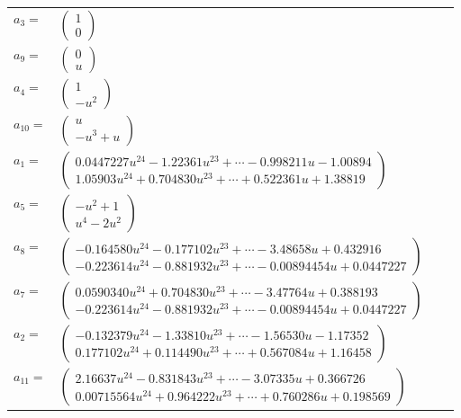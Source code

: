 \documentclass[1p]{elsarticle_modified}
\theoremstyle{definition}
\begin{document}
\begin{tabular}{m{7pt} m{180pt} m{7pt} m{180pt} }
\flushright $a_{3}=$&$\begin{pmatrix}1\\0\end{pmatrix}$ \\
\flushright $a_{9}=$&$\begin{pmatrix}0\\u\end{pmatrix}$ \\
\flushright $a_{4}=$&$\begin{pmatrix}1\\- u^2\end{pmatrix}$ \\
\flushright $a_{10}=$&$\begin{pmatrix}u\\- u^3+u\end{pmatrix}$ \\
\flushright $a_{1}=$&$\begin{pmatrix}0.0447227 u^{24}-1.22361 u^{23}+\cdots-0.998211 u-1.00894\\1.05903 u^{24}+0.704830 u^{23}+\cdots+0.522361 u+1.38819\end{pmatrix}$ \\
\flushright $a_{5}=$&$\begin{pmatrix}- u^2+1\\u^4-2 u^2\end{pmatrix}$ \\
\flushright $a_{8}=$&$\begin{pmatrix}-0.164580 u^{24}-0.177102 u^{23}+\cdots-3.48658 u+0.432916\\-0.223614 u^{24}-0.881932 u^{23}+\cdots-0.00894454 u+0.0447227\end{pmatrix}$ \\
\flushright $a_{7}=$&$\begin{pmatrix}0.0590340 u^{24}+0.704830 u^{23}+\cdots-3.47764 u+0.388193\\-0.223614 u^{24}-0.881932 u^{23}+\cdots-0.00894454 u+0.0447227\end{pmatrix}$ \\
\flushright $a_{2}=$&$\begin{pmatrix}-0.132379 u^{24}-1.33810 u^{23}+\cdots-1.56530 u-1.17352\\0.177102 u^{24}+0.114490 u^{23}+\cdots+0.567084 u+1.16458\end{pmatrix}$ \\
\flushright $a_{11}=$&$\begin{pmatrix}2.16637 u^{24}-0.831843 u^{23}+\cdots-3.07335 u+0.366726\\0.00715564 u^{24}+0.964222 u^{23}+\cdots+0.760286 u+0.198569\end{pmatrix}$ \\

\end{tabular}
\end{document}
